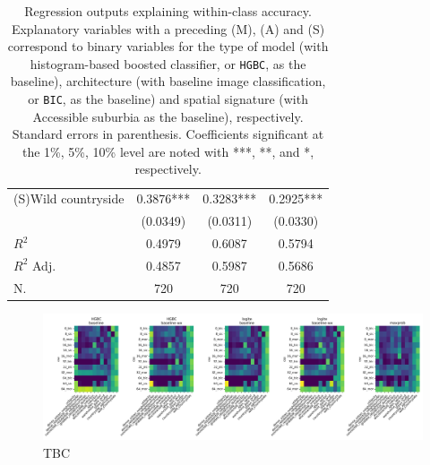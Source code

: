 \begin{table}
\begin{tabular}{lccc}
(S)Wild countryside                               &   0.3876*** &   0.3283*** &   0.2925*** \\
                                                  &    (0.0349) &    (0.0311) &    (0.0330) \\
\midrule
$R^2$                                             &      0.4979 &      0.6087 &      0.5794 \\
$R^2$ Adj.                                        &      0.4857 &      0.5987 &      0.5686 \\
N.                                                &      720    &      720    &      720    \\
\bottomrule
\end{tabular}
    \caption{\label{tab:non_sp_reg_wc}\footnotesize Regression outputs explaining
            within-class accuracy. Explanatory variables with a preceding (M),
            (A) and (S)
    correspond to binary variables for the type of model (with histogram-based
            boosted classifier, or \texttt{HGBC}, as the
    baseline), architecture (with baseline image classification, or
    \texttt{BIC}, as the baseline) and spatial signature (with Accessible
    suburbia as the baseline),
    respectively. Standard errors in parenthesis. Coefficients significant at
    the 1\%, 5\%, 10\% level are noted with ***, **, and *, respectively.}
\end{table}


\begin{figure}
    \centering
    \includegraphics[width=1.0\linewidth]{fig/wc_accuracy_x_model.png}
    \caption{\footnotesize TBC}
    \label{fig:prediction_comparison_maps}
\end{figure}






